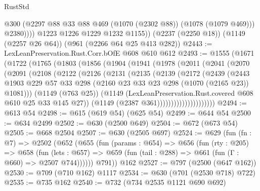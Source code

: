 \begin{lexlean}{RustStd}
\begin{coremodule}
{\begin{coremodule}
{{{{{{{{{{                @300
                (@2297 @88 @33 @88 @469 (@1070 (@2302 @88)) (@1078 (@1079 @469)))
                @2380))))
        @1223
        @1226
        @1229
        @1232
        @1155))
    (@2237 (@2250 @18))
    (@1149 (@2257 @26 @64))
    (@961 (@2266 @64 @25 @413 @282))
@2443 := LexLeanPreservation.Rust.Corr.bOfE @608 @610 @612
@2493 := @1555
    (@1671
      (@1722
        (@1765
          (@1803
            (@1856
              (@1904
                (@1941
                  (@1978
                    (@2011
                      (@2041
                        (@2070
                          (@2091
                            (@2108
                              (@2122
                                (@2126
                                  (@2131
                                    (@2135
                                      (@2139
                                        (@2172
                                          (@2439
                                            (@2443
                                              @1903
                                              @229
                                              @57
                                              @33
                                              @298
                                              (@2160 @23 @33 @23 @298 (@1070 (@2165 @23)) @1081)))
                                          (@1149 (@763 @25))
                                          (@1149
                                            (LexLeanPreservation.Rust.covered
                                              @608
                                              @610
                                              @25
                                              @33
                                              @145
                                              @27))
                                          (@1149 (@2387 @361)))))))))))))))))))))
@2494 := @613 @54
@2498 := @615 (@619 @54) (@625 @54)
@2499 := @644 @54
@2500 := @634 @2499
@2502 := @630 (@2500 @649)
@2504 := @672 (@673 @54)
@2505 := @668 @2504
@2507 := @630 (@2505 @697)
@2524 := @629
    (fun (fn : @7) =>
    @2502
      (@652
        (@655
          (fun (params : @654) =>
          @656
            (fun (rty : @205) =>
            @658
              (fun (lets : @657) =>
              @659 (fun (tail : @288) => @661 (fun (Γ : @660) => @2507 @744))))))
        @791))
    @162
@2527 := @797 (@2500 (@647 @162))
@2530 := @709 (@710 @162) @1117
@2534 := @630 (@701 (@2530 @718) @722)
@2535 := @735 @162
@2540 := @732 (@734 @2535 @1121 @690 @692)
}}}}}}}}}}
\end{coremodule}}
\end{coremodule}
\end{lexlean}
